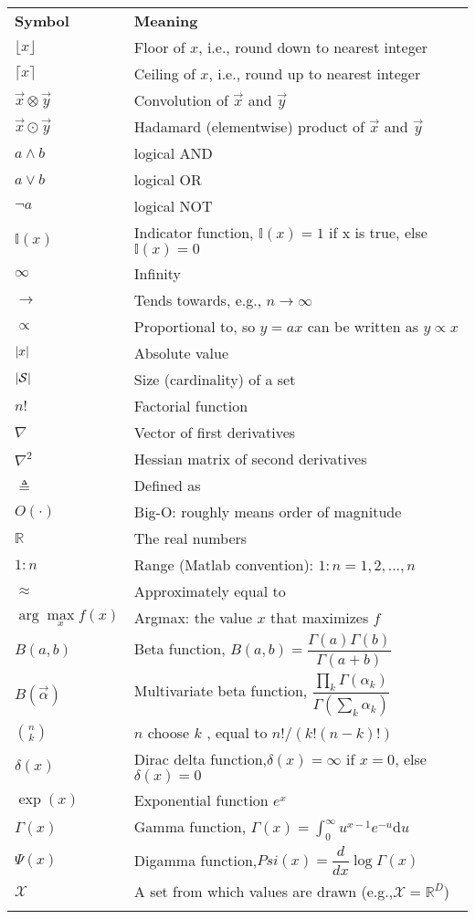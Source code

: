 {\begin{english}
\begin{longtable}{ll}
\hline\noalign{\smallskip}
\textbf{Symbol} & \textbf{Meaning} \\
\noalign{\smallskip}\hline\noalign{\smallskip}
$\lfloor x \rfloor$ & Floor of $x$, i.e., round down to nearest integer\\
$\lceil x \rceil$ & Ceiling of $x$, i.e., round up to nearest integer\\
$\vec{x} \otimes \vec{y}$ & Convolution of $\vec{x}$ and $\vec{y}$\\
$\vec{x} \odot \vec{y}$ & Hadamard (elementwise) product of $\vec{x}$ and $\vec{y}$\\
$a \wedge b$ & logical AND\\
$a \vee b$ & logical OR\\
$\neg a$ & logical NOT\\
$\mathbb{I}(x)$ & Indicator function, $\mathbb{I}(x)=1$ if x is true, else $\mathbb{I}(x)=0$\\
$\infty$ & Infinity\\
$\rightarrow$ & Tends towards, e.g., $n \rightarrow \infty$\\
$\propto$ &Proportional to, so $y = ax$ can be written as $y \propto x$\\
$\left\lvert x\right\rvert$ & Absolute value\\
$\left\lvert\mathcal{S}\right\rvert$ & Size (cardinality) of a set\\
$n!$ & Factorial function\\
$\nabla$ & Vector of first derivatives\\
$\nabla^2$ & Hessian matrix of second derivatives\\
$\triangleq$ & Defined as\\
$O(\cdot)$ & Big-O: roughly means order of magnitude\\
$\mathbb{R}$ & The real numbers\\
$1:n$ & Range (Matlab convention): $1:n = {1, 2,...,n}$\\
$\approx$ & Approximately equal to\\
$\arg\max\limits_x f(x)$ & Argmax: the value $x$ that maximizes $f$\\
$B(a,b)$ & Beta function, $B(a,b)=\dfrac{\Gamma(a)\Gamma(b)}{\Gamma(a+b)}$\\
$B(\vec{\alpha})$ & Multivariate beta function, $\dfrac{\prod\limits_k \Gamma(\alpha_k)}{\Gamma(\sum\limits_k \alpha_k)}$\\
$\binom{n}{k}$ & $n$ choose $k$ , equal to $n!/(k!(n−k )!)$\\
$\delta(x)$ & Dirac delta function,$\delta(x)=\infty$ if $x=0$, else $\delta(x)=0$\\
$\exp(x)$ & Exponential function $e^x$\\
$\Gamma(x)$ & Gamma function, $\Gamma(x)=\int_0^\infty u^{x-1}e^{-u}\mathrm{d}u$\\
$\Psi(x)$ &  Digamma function,$Psi(x)=\dfrac{d}{dx}\log\Gamma(x)$\\
$\mathcal{X}$ & A set from which values are drawn (e.g.,$\mathcal{X}=\mathbb{R}^D$)\\
\noalign{\smallskip}\hline\noalign{\smallskip}
\end{longtable}



\end{english}}
